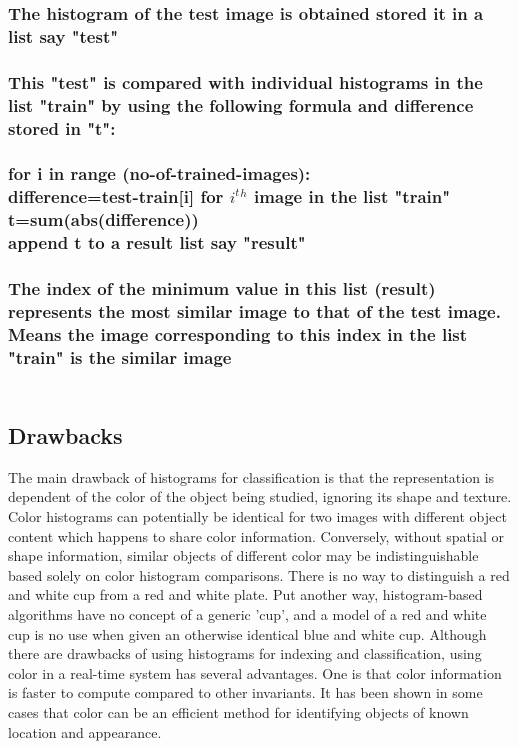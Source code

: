 \documentclass[10pt,a4paper]{article}
\newcommand{\tab}{\hspace*{4em}}
\begin{document}
\subsubsection{The histogram of the test image is obtained stored it in a list say "test"}
\subsubsection{This "test" is compared with individual histograms in the list "train" by using the following formula and difference stored in "t":\\ \\
			for i in range (no-of-trained-images): \\ 
			\tab difference=test-train[i] for $i^t$$^h$  image in the list "train" \\			
			\tab t=sum(abs(difference)) \\
			\tab append t to a result list say "result" \\ }
			
				
\subsubsection{The index of the minimum value in this list (result) represents the most similar image to that of the test image. Means the image corresponding to this index in the list "train" is the similar image\\ \\ } 
			 
\subsection{Drawbacks}
The main drawback of histograms for classification is that the representation is dependent of the color of the object being studied, ignoring its shape and texture. Color histograms can potentially be identical for two images with different object content which happens to share color information. Conversely, without spatial or shape information, similar objects of different color may be indistinguishable based solely on color histogram comparisons. There is no way to distinguish a red and white cup from a red and white plate. Put another way, histogram-based algorithms have no concept of a generic 'cup', and a model of a red and white cup is no use when given an otherwise identical blue and white cup.
 Although there are drawbacks of using histograms for indexing and classification, using color in a real-time system has several advantages. One is that color information is faster to compute compared to other invariants. It has been shown in some cases that color can be an efficient method for identifying objects of known location and appearance.
\end{document}
